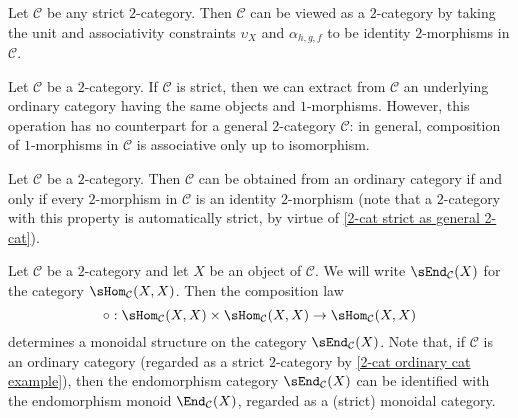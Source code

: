 \begin{example}\label{2-cat strict as general 2-cat}
Let $\mathcal{C}$ be any strict $2$-category. Then $\mathcal{C}$ can be viewed as a $2$-category by taking the unit and associativity constraints $\upsilon_X$ and $\alpha_{h,g,f}$ to be identity $2$-morphisms in $\mathcal{C}$.
\end{example}
\begin{remark}\label{2-cat underlying cat if strict}
Let $\mathcal{C}$ be a $2$-category. If $\mathcal{C}$ is strict, then we can extract from $\mathcal{C}$ an underlying ordinary category having the same objects and $1$-morphisms. However, this operation has no counterpart for a general $2$-category $\mathcal{C}$: in general, composition of $1$-morphisms in $\mathcal{C}$ is associative only up to isomorphism.
\end{remark}
\begin{remark}
Let $\mathcal{C}$ be a $2$-category. Then $\mathcal{C}$ can be obtained from an ordinary category if and only if every $2$-morphism in $\mathcal{C}$ is an identity $2$-morphism (note that a $2$-category with this property is automatically strict, by virtue of \cref{2-cat strict as general 2-cat}).
\end{remark}
\begin{remark}\label{2-cat endomorphism cat monoidal}
Let $\mathcal{C}$ be a $2$-category and let $X$ be an object of $\mathcal{C}$. We will write $\sEnd_{\mathcal{C}}(X)$ for the category $\sHom_{\mathcal{C}}(X,X)$. Then the composition law
\[\circ:\sHom_{\mathcal{C}}(X,X)\times\sHom_{\mathcal{C}}(X,X)\to\sHom_{\mathcal{C}}(X,X)\]
determines a monoidal structure on the category $\sEnd_{\mathcal{C}}(X)$. Note that, if $\mathcal{C}$ is an ordinary category (regarded as a strict $2$-category by \cref{2-cat ordinary cat example}), then the endomorphism category $\sEnd_{\mathcal{C}}(X)$ can be identified with the endomorphism monoid $\End_{\mathcal{C}}(X)$, regarded as a (strict) monoidal category.
\end{remark}
